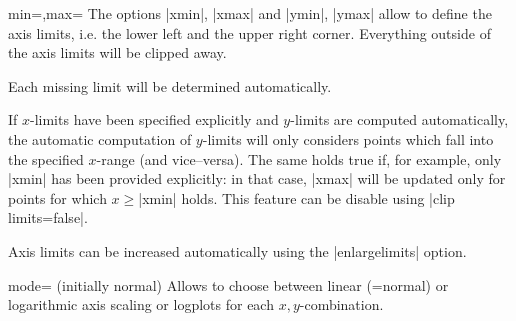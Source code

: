 \begin{pgfplotsxykeylist}{\x min=,\x max=}
The options |xmin|, |xmax| and |ymin|, |ymax| allow to define the axis limits, i.e. the lower left and the upper right corner. Everything outside of the axis limits will be clipped away.

Each missing limit will be determined automatically.

If $x$-limits have been specified explicitly and $y$-limits are computed automatically, the automatic computation of $y$-limits will only considers points which fall into the specified $x$-range (and vice--versa). The same holds true if, for example, only |xmin| has been provided explicitly: in that case, |xmax| will be updated only for points for which $x \ge $|xmin| holds. This feature can be disable using |clip limits=false|. 

Axis limits can be increased automatically using the |enlargelimits| option.
\begin{codeexample}[]
\end{codeexample}

\begin{codeexample}[]
\end{codeexample}

\begin{codeexample}[]
\end{codeexample}
\end{pgfplotsxykeylist}

\begin{pgfplotsxykey}{\x mode= (initially normal)}
Allows to choose between linear (=normal) or logarithmic axis scaling or logplots for each $x,y$-combination.
\end{pgfplotsxykey}

